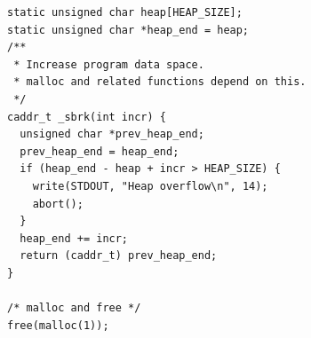 \begin{figure}
  \vspace{-10pt}
  \begin{center}
    \begin{lstlisting}
static unsigned char heap[HEAP_SIZE];
static unsigned char *heap_end = heap;
/**
 * Increase program data space.
 * malloc and related functions depend on this.
 */
caddr_t _sbrk(int incr) {
  unsigned char *prev_heap_end;
  prev_heap_end = heap_end;
  if (heap_end - heap + incr > HEAP_SIZE) {
    write(STDOUT, "Heap overflow\n", 14);
    abort();
  }
  heap_end += incr;
  return (caddr_t) prev_heap_end;
}

/* malloc and free */
free(malloc(1));
    \end{lstlisting}
  \end{center}
  \vspace{-10pt}
\end{figure}

